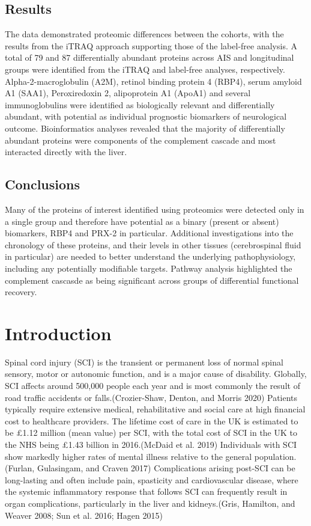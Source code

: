 \documentclass[
]{article}
\begin{document}
\hypertarget{results}{%
\subsection{Results}\label{results}}

The data demonstrated proteomic differences between the cohorts, with the results from the iTRAQ approach supporting those of the label-free analysis.
A total of 79 and 87 differentially abundant proteins across AIS and longitudinal groups were identified from the iTRAQ and label-free analyses, respectively.
Alpha-2-macroglobulin (A2M), retinol binding protein 4 (RBP4), serum amyloid A1 (SAA1), Peroxiredoxin 2, alipoprotein A1 (ApoA1) and several immunoglobulins were identified as biologically relevant and differentially abundant, with potential as individual prognostic biomarkers of neurological outcome.
Bioinformatics analyses revealed that the majority of differentially abundant proteins were components of the complement cascade and most interacted directly with the liver.

\hypertarget{conclusions}{%
\subsection{Conclusions}\label{conclusions}}

Many of the proteins of interest identified using proteomics were detected only in a single group and therefore have potential as a binary (present or absent) biomarkers, RBP4 and PRX-2 in particular.
Additional investigations into the chronology of these proteins, and their levels in other tissues (cerebrospinal fluid in particular) are needed to better understand the underlying pathophysiology, including any potentially modifiable targets.
Pathway analysis highlighted the complement cascasde as being significant across groups of differential functional recovery.

\hypertarget{introduction-1}{%
\section{Introduction}\label{introduction-1}}

Spinal cord injury (SCI) is the transient or permanent loss of normal spinal sensory, motor or autonomic function, and is a major cause of disability.
Globally, SCI affects around 500,000 people each year and is most commonly the result of road traffic accidents or falls.(Crozier-Shaw, Denton, and Morris 2020) Patients typically require extensive medical, rehabilitative and social care at high financial cost to healthcare providers. The lifetime cost of care in the UK is estimated to be £1.12 million (mean value) per SCI, with the total cost of SCI in the UK to the NHS being £1.43 billion in 2016.(McDaid et al. 2019) Individuals with SCI show markedly higher rates of mental illness relative to the general population.(Furlan, Gulasingam, and Craven 2017) Complications arising post-SCI can be long-lasting and often include pain, spasticity and cardiovascular disease, where the systemic inflammatory response that follows SCI can frequently result in organ complications, particularly in the liver and kidneys.(Gris, Hamilton, and Weaver 2008; Sun et al. 2016; Hagen 2015)
\end{document}
